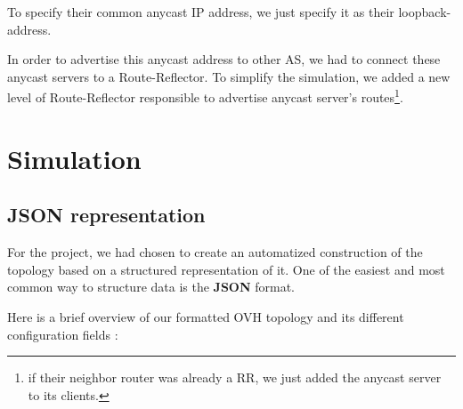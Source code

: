 \documentclass[letter, 9pt, conference]{ieeeconf}
\begin{document}
To specify their common anycast IP address, we just specify it as their loopback-address. 

In order to advertise this anycast address to other AS, we had to connect these anycast servers to a Route-Reflector. To simplify the simulation, we added a new level of Route-Reflector responsible to advertise anycast server's routes\footnote{if their neighbor router was already a RR, we just added the anycast server to its clients.}. 

\section{Simulation}
\label{sec:simulation}

\subsection{JSON representation}
\label{sec:json}

For the project, we had chosen to create an automatized construction of the topology based on a structured representation of it. One of the easiest and most common way to structure data is the \textbf{JSON} format. 

Here is a brief overview of our formatted OVH topology and its different configuration fields :
\end{document}
